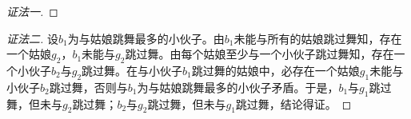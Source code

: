\documentclass{article}
\begin{document}
\begin{CJK}{UTF8}{gbsn}
\begin{proof}[证法一]
\end{proof}
\begin{proof}[证法二]设$b_1$为与姑娘跳舞最多的小伙子。由$b_1$未能与所有的姑娘跳过舞知，存在一个姑娘$g_2$，$b_1$未能与$g_2$跳过舞。由每个姑娘至少与一个小伙子跳过舞知，存在一个小伙子$b_2$与$g_2$跳过舞。在与小伙子$b_1$跳过舞的姑娘中，必存在一个姑娘$g_1$未能与小伙子$b_2$跳过舞，否则与$b_1$为与姑娘跳舞最多的小伙子矛盾。于是，$b_1$与$g_1$跳过舞，但未与$g_2$跳过舞；$b_2$与$g_2$跳过舞，但未与$g_1$跳过舞，结论得证。  
\end{proof}

\end{CJK}
\end{document}
